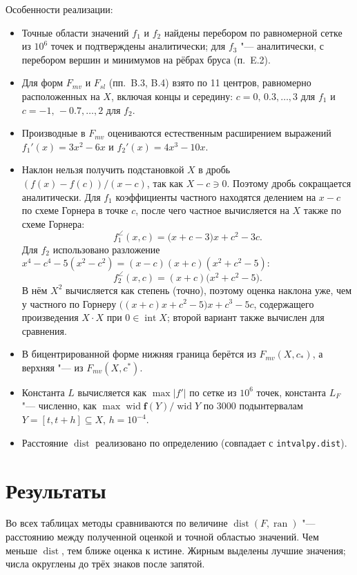 \documentclass[12pt,a4paper]{article}
\newcommand{\ran}{\operatorname{ran}}
\newcommand{\wid}{\operatorname{wid}}
\newcommand{\dist}{\operatorname{dist}}
\newcommand{\inter}{\operatorname{int}}
\newcommand{\bff}{\mathbf{f}}
\begin{document}
Особенности реализации:
\begin{itemize}
\item Точные области значений $f_1$ и $f_2$ найдены перебором по равномерной сетке из $10^6$ точек и подтверждены аналитически; для $f_3$ "--- аналитически, с перебором вершин и минимумов на рёбрах бруса (п.~E.2).
\item Для форм $F_{mv}$ и $F_{sl}$ (пп.~B.3, B.4) взято по 11 центров, равномерно расположенных на $X$, включая концы и середину: $c=0,\,0.3,\dots,3$ для $f_1$ и $c=-1,\,-0.7,\dots,2$ для $f_2$.
\item Производные в $F_{mv}$ оцениваются естественным расширением выражений $f_1'(x)=3x^2-6x$ и $f_2'(x)=4x^3-10x$.
\item Наклон нельзя получить подстановкой $X$ в дробь $(f(x)-f(c))/(x-c)$, так как $X-c\ni0$. Поэтому дробь сокращается аналитически. Для $f_1$ коэффициенты частного находятся делением на $x-c$ по схеме Горнера в точке $c$, после чего частное вычисляется на $X$ также по схеме Горнера:
\[
f_1^{\angle}(x,c)=\bigl(x+c-3\bigr)x+c^2-3c.
\]
Для $f_2$ использовано разложение $x^4-c^4-5(x^2-c^2)=(x-c)(x+c)(x^2+c^2-5)$:
\[
f_2^{\angle}(x,c)=(x+c)\bigl(x^2+c^2-5\bigr).
\]
В нём $X^2$ вычисляется как степень (точно), поэтому оценка наклона уже, чем у частного по Горнеру $\bigl((x+c)x+c^2-5\bigr)x+c^3-5c$, содержащего произведения $X\cdot X$ при $0\in\inter X$; второй вариант также вычислен для сравнения.
\item В бицентрированной форме нижняя граница берётся из $F_{mv}(X,c_{*})$, а верхняя "--- из $F_{mv}(X,c^{*})$.
\item Константа $L$ вычисляется как $\max|f'|$ по сетке из $10^6$ точек, константа $L_F$ "--- численно, как $\max\wid\bff(Y)/\wid Y$ по 3000 подынтервалам $Y=[t,t+h]\subseteq X$, $h=10^{-4}$.
\item Расстояние $\dist$ реализовано по определению (совпадает с \texttt{intvalpy.dist}).
\end{itemize}

\section{Результаты}

Во всех таблицах методы сравниваются по величине $\dist(F,\ran)$ "--- расстоянию между полученной оценкой и точной областью значений. Чем меньше $\dist$, тем ближе оценка к истине. Жирным выделены лучшие значения; числа округлены до трёх знаков после запятой.
\end{document}
